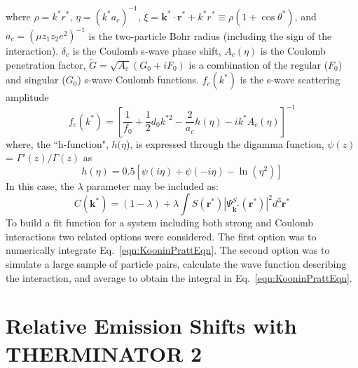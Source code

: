 \documentclass[ALICE,manyauthors]{cernphprep}
\begin{document}
where $\rho = k^{*}r^{*}$, $\eta = (k^{*}a_{c})^{-1}$, $\xi = \mathbf{k^{*}} \cdot \mathbf{r^{*}} + k^{*}r^{*} \equiv \rho(1+\cos\theta^{*})$, and $a_{c} = (\mu z_{1}z_{2}e^{2})^{-1}$ is the two-particle Bohr radius (including the sign of the interaction).  
$\delta_{c}$ is the Coulomb s-wave phase shift, $A_{c}(\eta)$ is the Coulomb penetration factor, $\tilde{G} = \sqrt{A_{c}}(G_{0} + iF_{0})$ is a combination of the regular ($F_{0}$) and singular ($G_{0}$) s-wave Coulomb functions.  
$f_{c}(k^{*})$ is the s-wave scattering amplitude
\begin{equation}
 f_{c}(k^{*}) = \left[\frac{1}{f_{0}} + \frac{1}{2}d_{0}k^{*2} - \frac{2}{a_{c}}h(\eta) - ik^{*}A_{c}(\eta)\right]^{-1}
\label{eqn:CoulombScattAmp}
\end{equation}
where, the ``h-function", $h(\eta$), is expressed through the digamma function, $\psi(z)$ = $\Gamma'(z)/\Gamma(z)$ as
\begin{equation}
 h(\eta) = 0.5[\psi(i\eta) + \psi(-i\eta) - \ln(\eta^{2})]
\label{eqn:LednickyHFunction}
\end{equation} 
In this case, the $\lambda$ parameter may be included as: 
\begin{equation}
 C(\mathbf{k^{*}}) = (1 - \lambda) + \lambda\int S(\mathbf{r^{*}})|\Psi^{S}_{\mathbf{k^{*}}}(\mathbf{r^{*}})|^{2}d^{3}\mathbf{r^{*}}
\label{eqn:GenCfEqnwLambda}
\end{equation}
To build a fit function for a system including both strong and Coulomb interactions two related options were considered. 
The first option was to numerically integrate Eq.\ \ref{eqn:KooninPrattEqn}.  
The second option was to simulate a large sample of particle pairs, calculate the wave function describing the interaction, and average to obtain the integral in Eq.\ \ref{eqn:KooninPrattEqn}. 


\section{Relative Emission Shifts with THERMINATOR 2}
\label{App:THERM}
\end{document}
